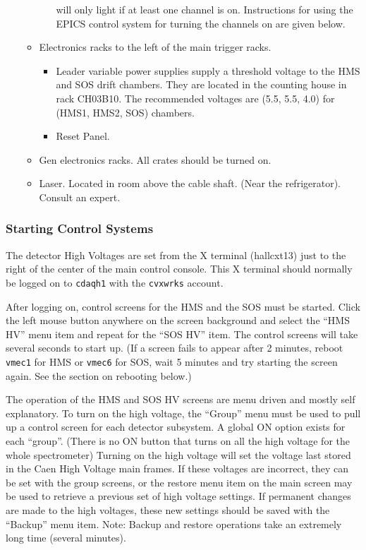 \begin{enumerate}
\begin{itemize}
\begin{itemize}
will only light if at least one channel is on.  Instructions for using the
EPICS control system for turning the channels on are given below.
\end{itemize}
\item Electronics racks to the left of the main trigger racks.
\begin{itemize}
\item Leader variable power supplies supply a threshold voltage to the
HMS and SOS  drift chambers.
They are located in the counting house in rack CH03B10.  The recommended
voltages are (5.5, 5.5, 4.0) for (HMS1, HMS2, SOS) chambers.
\item Reset Panel.
\end{itemize}
\item Gen electronics racks.  All crates should be turned on.
\item Laser.  Located in room above the cable shaft.  (Near the refrigerator).
Consult an expert.
\end{itemize}
\end{enumerate}

\subsubsection{Starting Control Systems}\label{par:hv_ops}
The detector High Voltages are set from the X terminal (hallcxt13) just to
the right of the center of the main control console.
This X terminal should normally be
logged on to \verb|cdaqh1| with the \verb|cvxwrks|
account.

After logging on, control screens for the HMS and the SOS must be started.
Click the left mouse button anywhere on the screen background and select
the ``HMS HV'' menu item and repeat for the ``SOS HV'' item.  The control
screens will take several seconds to start up.
(If a screen fails to
appear after 2 minutes, reboot \verb|vmec1| for HMS or \verb|vmec6| for
SOS, wait 5 minutes and try starting the screen again.  See the section on
rebooting below.)

The operation of the HMS and SOS HV screens are menu driven and mostly self
explanatory.
To turn on the high voltage, the ``Group'' menu must be used to pull up
a control screen for each detector subsystem.  A
global ON option exists for each ``group''.  (There is no ON button that
turns on all the high voltage for the whole spectrometer)
Turning on the high voltage
will set the voltage last stored in the Caen High Voltage main frames.  If
these voltages are incorrect, they can be set with the group screens, or the
restore menu item on the main screen may be used to retrieve a previous
set of high voltage settings.  If permanent changes are made to the high
voltages, these new settings should be saved with the ``Backup'' menu
item.  Note:  Backup and restore operations take an extremely long time
(several minutes).

